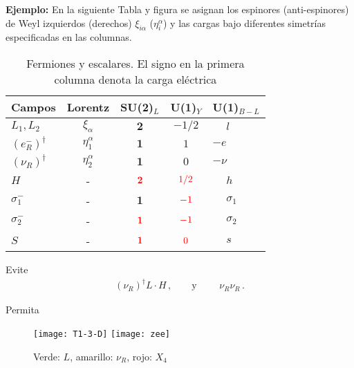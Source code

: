 \noindent
\textbf{Ejemplo:} 
En la siguiente Tabla y figura se asignan los espinores (anti-espinores) de Weyl izquierdos (derechos) $\xi_{i\alpha}$ ($\eta^{\alpha}_i$)  y las cargas bajo diferentes simetrías especificadas en las columnas.



\begin{frame}

\begin{table}
  \centering
    \begin{tabular}{|l|c|c|c|l|}\hline
    Campos &Lorentz& SU(2)$_{L}$ & U(1)$_Y$ & U(1)$_{B-L}$\\\hline
    $L_1,L_2$ & $\xi_{\alpha}$& $\mathbf{2}$ & $-1/2$&$\phantom{-}l$\\
    $\left(e_R^{-}\right)^{\dagger}$ & $\eta_1^\alpha$& $\mathbf{1}$ & $1$&$-e$\\
    $\left(\nu_R\right)^{\dagger}$ &$\eta_2^\alpha$ & $\mathbf{1}$ & $0$&$-\nu$\\
     $H$  &-&$\color{red}\mathbf{2}$&$\color{red}1/2$&$\phantom{-}h$\\
     $\sigma_1^-$ &-&$\mathbf{1}$&$\color{red}-1$&$\phantom{-}\sigma_1$\\
     $\sigma_2^-$ &-&$\color{red}\mathbf{1}$&$\color{red}-1$&$\phantom{-}\sigma_2$\\
     $S$ &-&$\color{red}\mathbf{1}$&${\color{red}0}$&$\phantom{-}s$\\\hline
  \end{tabular}\hspace{1cm} 
  \caption{Fermiones y escalares. El signo en la primera columna denota la carga eléctrica }
  \label{tab:fs}
\end{table}


Evite
\begin{align}
  \left( \nu_R \right)^{\dagger} L\cdot H\,,\qquad\text{y }\qquad \nu_R \nu_R\,.
\end{align}
\end{frame}

\begin{frame}
Permita


\begin{figure}
  \centering
  \texttt{[image: T1-3-D]} \hspace{1cm}
  \texttt{[image: zee]}
  \caption{Verde: $L$, amarillo: $\nu_R$, rojo: $X_4$  }
  \label{fig:gg}
\end{figure}
\end{frame}

